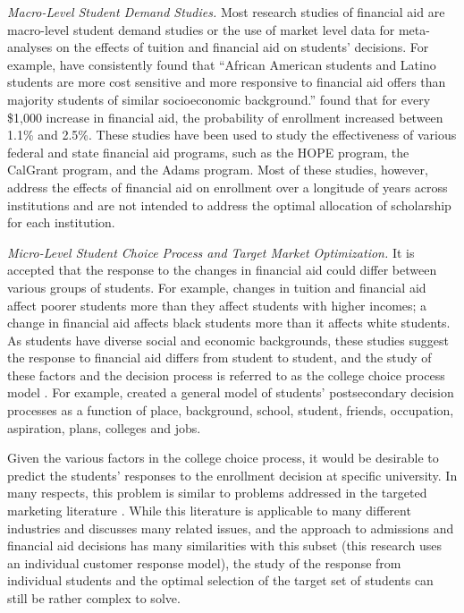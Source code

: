 \documentclass[12pt,english]{report}
\begin{document}
\vspace{0.1in}
\noindent \textit{Macro-Level Student Demand Studies.} 
Most research studies of financial aid are  macro-level student demand studies or the use of market level data for meta-analyses on the effects of tuition and financial aid on students' decisions.  For example, \citet{Hossler1989} have consistently found that ``African American students and Latino students are more cost sensitive and more responsive to financial aid offers than majority students of similar socioeconomic background.''  \citet{Braunstein1999} found that for every \$1,000 increase in financial aid, the probability  of  enrollment increased between 1.1\% and 2.5\%.  These studies have been used to study the effectiveness of various federal and state financial aid programs, such as the HOPE program, the CalGrant program, and the Adams program.  Most of these studies, however, address the effects of financial aid on enrollment over a longitude of years across institutions and are not intended to address the optimal  allocation of scholarship for each institution. 

\vspace{0.1in}
\noindent \textit{Micro-Level Student Choice Process and Target Market Optimization.} 
It is accepted that the response to the changes in financial aid could differ between various groups of students. For example, changes in tuition and financial aid affect poorer students more than they affect students with higher incomes; a change in financial aid affects black students more than it affects white students. As students have diverse social and economic backgrounds, these studies suggest the response to financial aid differs from student to student, and the study of these factors and the decision process is referred  to as the college choice process model \citep{Paulsen1990}. For example, \citet{Jackson1978} created a general model of students' postsecondary decision processes as a function of place, background, school, student, friends, occupation, aspiration, plans, colleges and jobs.

Given the various factors in the college choice process, it would be desirable to predict the students' responses to the enrollment decision at specific university.  In many respects, this problem is similar to problems addressed in the targeted marketing literature \citep{Belloni2012}. While this literature is applicable to many different industries and discusses many related issues, and the approach to admissions and financial aid decisions has many similarities with this subset (this research uses an individual customer response model), the study of the response from individual students and the optimal selection of the target set of students can still be rather complex to solve.
\end{document}
